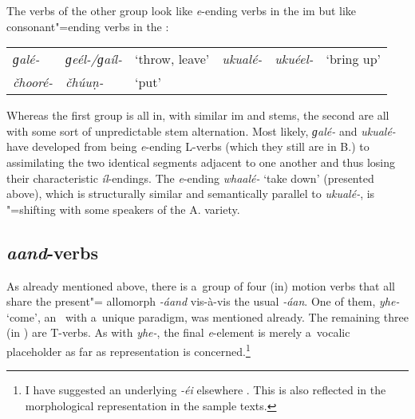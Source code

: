 The verbs of the other group look like \textit{e}-ending verbs in the im but like consonant"=ending verbs in the : 


\begin{table}[H]
\begin{tabularx}{\textwidth}{ Q l l Q Q l }

\textit{ɡalé-} &
\textit{ɡeél-/ɡaíl-} &
`throw, leave'{\protect\footnotemark} &
\textit{ukualé-} &
\textit{ukuéel-} &
`bring up'{\protect\footnotemark}\\
\textit{čhooré-} &
\textit{čhúuṇ-} &
`put' &
&
&
\\
\end{tabularx}
\end{table}

\addtocounter{footnote}{-2}

Whereas the first group is all in, with similar im and  stems, the second are all  with some sort of unpredictable stem alternation. Most likely, \textit{ɡalé-} and \textit{ukualé-} have developed from being \textit{e}-ending L-verbs (which they still are in B.) to assimilating the two identical segments adjacent to one another and thus losing their characteristic \textit{íl}-endings. The \textit{e}-ending  \textit{whaalé-} `take down' (presented above), which is structurally similar and semantically parallel to \textit{ukualé-}, is "=shifting with some speakers of the A. variety. 


\subsection{\textit{aand}-verbs}
\label{subsec:8-3-8}


As already mentioned above, there is a~group of four (in) motion verbs that all share the present"= allomorph \textit{-áand} vis-à-vis the usual \textit{-áan}. One of them, \textit{yhe-} `come', an~ with a~unique paradigm, was mentioned already. The remaining three (in ) are T-verbs. As with \textit{yhe-}, the final \textit{e}-element is merely a~vocalic placeholder as far as representation is concerned.\footnote{I have suggested an underlying \textit{-éi} elsewhere \citep{liljegrenhaider2011,liljegrenhaider2015}. This is also reflected in the morphological representation in the sample texts.}


